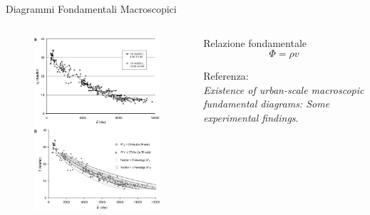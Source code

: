 \documentclass[11pt,]{beamer}
\begin{document}
\begin{frame}{Diagrammi Fondamentali Macroscopici}
	\begin{columns}[c]
		\begin{column}{.6\textwidth}
			\begin{figure}
				\includegraphics[width=.83\linewidth]{daganzo2.jpg}
			\end{figure}
		\end{column}
		\begin{column}{.4\textwidth}
			\begin{block}{Relazione fondamentale}
				\begin{equation*}
					\Phi=\rho v
				\end{equation*}
			\end{block}
			\vspace{10mm}
			Referenza: \\ \emph{Existence of urban-scale macroscopic fundamental
			diagrams: Some experimental findings}.
		\end{column}	
	\end{columns}
\end{frame}
\end{document}
